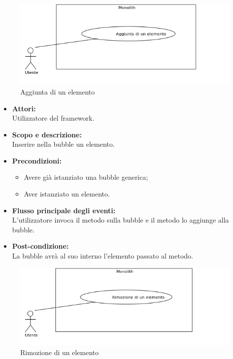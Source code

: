 
\begin{figure}[H]
	\centering
	\includegraphics[width=15cm]{../../documenti/AnalisiDeiRequisiti/Diagrammi_img/uc1_04.png}
	\caption{\UCFCaption{} Aggiunta di un elemento}
\end{figure}

\begin{itemize}
	\item \textbf{Attori:}
	\\Utilizzatore del framework.
	\item \textbf{Scopo e descrizione:} 
	\\Inserire nella bubble un elemento.
	\item \textbf{Precondizioni:}
	\begin{itemize}
		\item Avere già istanziato una bubble generica;
		\item Aver istanziato un elemento.
	\end{itemize}
	\item \textbf{Flusso principale degli eventi:}
	\\L'utilizzatore invoca il metodo sulla bubble e il metodo lo aggiunge alla bubble.
	\item \textbf{Post-condizione:}
	\\La bubble avrà al suo interno l'elemento passato al metodo.
\end{itemize}


\begin{figure}[H]
	\centering
	\includegraphics[width=15cm]{../../documenti/AnalisiDeiRequisiti/Diagrammi_img/uc1_03.png}
	\caption{\UCCCaption{} Rimozione di un elemento}
\end{figure}


